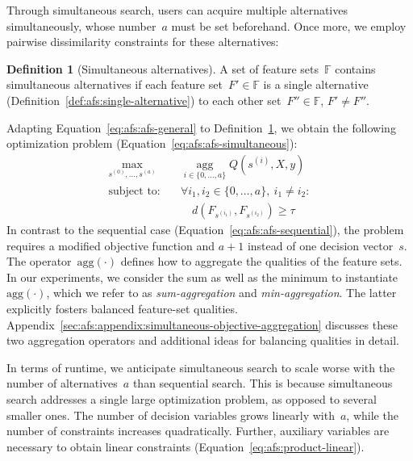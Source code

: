 \documentclass[iicol, sn-basic, Numbered]{sn-jnl} %
\theoremstyle{plain}
\theoremstyle{definition}
\newtheorem{definition}{Definition}
\begin{document}
Through simultaneous search, users can acquire multiple alternatives simultaneously, whose number~$a$ must be set beforehand.
Once more, we employ pairwise dissimilarity constraints for these alternatives:
%
\begin{definition}[Simultaneous alternatives]
	A set of feature sets~$\mathbb{F}$ contains simultaneous alternatives if each feature set~$F' \in \mathbb{F}$ is a single alternative (Definition~\ref{def:afs:single-alternative}) to each other set~$F'' \in \mathbb{F}$, $F' \neq F''$.
	\label{def:afs:simultaneous-alternative}
\end{definition}
%
Adapting Equation~\ref{eq:afs:afs-general} to Definition~\ref{def:afs:simultaneous-alternative}, we obtain the following optimization problem (Equation~\ref{eq:afs:afs-simultaneous}):
%
\begin{equation}
	\begin{aligned}
		\max_{s^{(0)}, \dots, s^{(a)}} &\quad \operatorname*{agg}_{i \in \{0, \dots, a\}} Q(s^{(i)},X,y) \\
		\text{subject to:} &\quad \forall i_1, i_2 \in \{0, \dots, a\},~i_1 \neq i_2: \\
		& \quad\quad d(F_{s^{(i_1)}},F_{s^{(i_2)}}) \geq \tau
	\end{aligned}
	\label{eq:afs:afs-simultaneous}
\end{equation}
%
In contrast to the sequential case (Equation~\ref{eq:afs:afs-sequential}), the problem requires a modified objective function and $a+1$ instead of one decision vector~$s$.
The operator~$\text{agg}(\cdot)$ defines how to aggregate the qualities of the feature sets.
In our experiments, we consider the sum as well as the minimum to instantiate~$\text{agg}(\cdot)$, which we refer to as \emph{sum-aggregation} and \emph{min-aggregation}.
The latter explicitly fosters balanced feature-set qualities.
Appendix~\ref{sec:afs:appendix:simultaneous-objective-aggregation} discusses these two aggregation operators and additional ideas for balancing qualities in detail.

In terms of runtime, we anticipate simultaneous search to scale worse with the number of alternatives~$a$ than sequential search. 
This is because simultaneous search addresses a single large optimization problem, as opposed to several smaller ones. 
The number of decision variables grows linearly with~$a$, while the number of constraints increases quadratically.
Further, auxiliary variables are necessary to obtain linear constraints (Equation~\ref{eq:afs:product-linear}).
\end{document}
